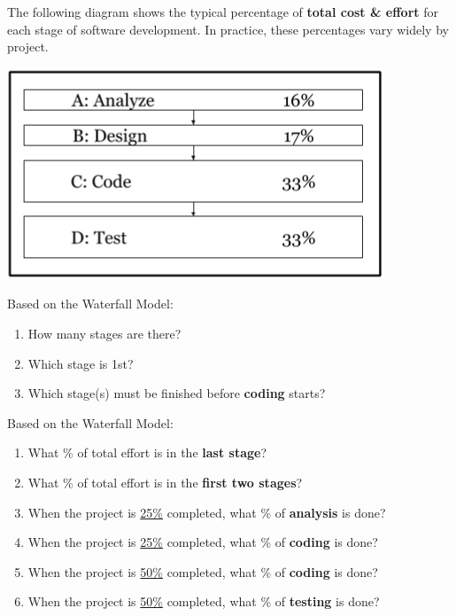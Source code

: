 

The following diagram shows the typical percentage of \textbf{total cost \& effort} for each stage of software development.
In practice, these percentages vary widely by project.

\begin{center}
\includegraphics[scale=0.75]{waterfall.png}
\end{center}




\Q Based on the Waterfall Model:

\begin{enumerate}%

\item How many stages are there?

\item Which stage is 1st?

\item Which stage(s) must be finished before \textbf{coding} starts?

\end{enumerate}


\Q Based on the Waterfall Model:

\begin{enumerate}%

\item What \% of total effort is in the \textbf{last stage}?

\item What \% of total effort is in the \textbf{first two stages}?

\item When the project is \underline{25\%} completed, what \% of \textbf{analysis} is done?

\item When the project is \underline{25\%} completed, what \% of \textbf{coding} is done?

\item When the project is \underline{50\%} completed, what \% of \textbf{coding} is done?

\item When the project is \underline{50\%} completed, what \% of \textbf{testing} is done?

\end{enumerate}


